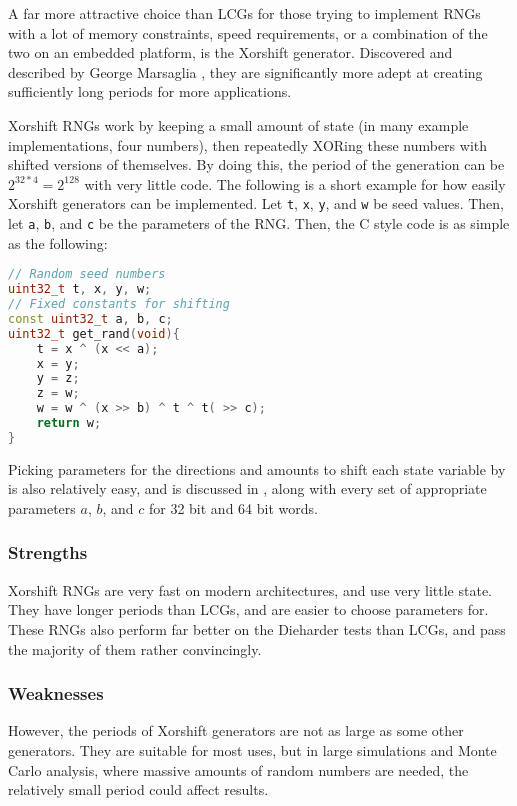 A far more attractive choice than LCGs for those trying to implement RNGs with a lot of memory constraints, speed requirements, or a combination of the two on an embedded platform, is the Xorshift generator. Discovered and described by George Marsaglia \cite{marsaglia2003xorshift}, they are significantly more adept at creating sufficiently long periods for more applications.

Xorshift RNGs work by keeping a small amount of state (in many example implementations, four numbers), then repeatedly XORing these numbers with shifted versions of themselves. By doing this, the period of the generation can be $2^{32 * 4} = 2^{128}$ with very little code. The following is a short example for how easily Xorshift generators can be implemented. Let \texttt{t}, \texttt{x}, \texttt{y}, and \texttt{w} be seed values. Then, let \texttt{a}, \texttt{b}, and \texttt{c} be the parameters of the RNG. Then, the C style code is as simple as the following:

\begin{lstlisting}[frame=single,language=C++,basicstyle=\ttfamily]
// Random seed numbers
uint32_t t, x, y, w;
// Fixed constants for shifting
const uint32_t a, b, c;
uint32_t get_rand(void){
    t = x ^ (x << a);
    x = y;
    y = z;
    z = w;
    w = w ^ (x >> b) ^ t ^ t( >> c);
    return w;
}
\end{lstlisting}

Picking parameters for the directions and amounts to shift each state variable by is also relatively easy, and is discussed in \cite{marsaglia2003xorshift}, along with every set of appropriate parameters $a$, $b$, and $c$ for 32 bit and 64 bit words.

\subsubsection{Strengths}

Xorshift RNGs are very fast on modern architectures, and use very little state. They have longer periods than LCGs, and are easier to choose parameters for. These RNGs also perform far better on the Dieharder tests than LCGs, and pass the majority of them rather convincingly.

\subsubsection{Weaknesses}

However, the periods of Xorshift generators are not as large as some other generators. They are suitable for most uses, but in large simulations and Monte Carlo analysis, where massive amounts of random numbers are needed, the relatively small period could affect results.
